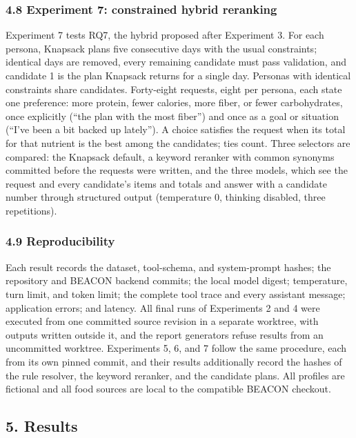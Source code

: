 \documentclass[
  10pt,
  letterpaper,
]{article}
\begin{document}
\subsubsection{4.8 Experiment 7: constrained hybrid
reranking}\label{experiment-7-constrained-hybrid-reranking}

Experiment 7 tests RQ7, the hybrid proposed after Experiment 3. For each
persona, Knapsack plans five consecutive days with the usual
constraints; identical days are removed, every remaining candidate must
pass validation, and candidate 1 is the plan Knapsack returns for a
single day. Personas with identical constraints share candidates.
Forty-eight requests, eight per persona, each state one preference: more
protein, fewer calories, more fiber, or fewer carbohydrates, once
explicitly (``the plan with the most fiber'') and once as a goal or
situation (``I've been a bit backed up lately''). A choice satisfies the
request when its total for that nutrient is the best among the
candidates; ties count. Three selectors are compared: the Knapsack
default, a keyword reranker with common synonyms committed before the
requests were written, and the three models, which see the request and
every candidate's items and totals and answer with a candidate number
through structured output (temperature 0, thinking disabled, three
repetitions).

\subsubsection{4.9 Reproducibility}\label{reproducibility}

Each result records the dataset, tool-schema, and system-prompt hashes;
the repository and BEACON backend commits; the local model digest;
temperature, turn limit, and token limit; the complete tool trace and
every assistant message; application errors; and latency. All final runs
of Experiments 2 and 4 were executed from one committed source revision
in a separate worktree, with outputs written outside it, and the report
generators refuse results from an uncommitted worktree. Experiments 5,
6, and 7 follow the same procedure, each from its own pinned commit, and
their results additionally record the hashes of the rule resolver, the
keyword reranker, and the candidate plans. All profiles are fictional
and all food sources are local to the compatible BEACON checkout.

\subsection{5. Results}\label{results}
\end{document}
